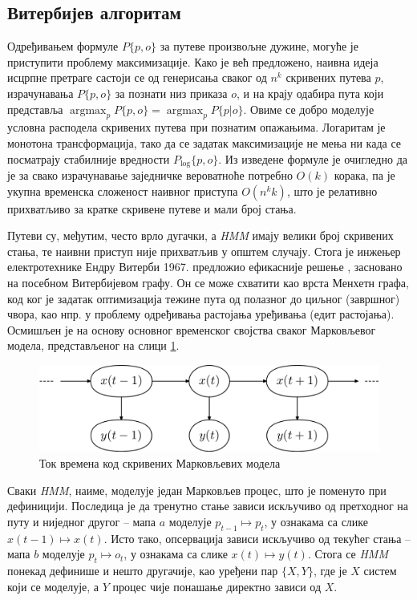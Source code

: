 \documentclass[12pt,oneside]{memoir}
\begin{document}
\begin{CJK}{UTF8}{ipxm}
\section{Витербијев алгоритам}
Одређивањем формуле $P\{p, o\}$ за путеве произвољне дужине, могуће је приступити проблему максимизације. Како је већ предложено, наивна идеја исцрпне претраге састоји се од генерисања сваког од $n^k$ скривених путева $p$, израчунавања $P\{p, o\}$ за познати низ приказа $o$, и на крају одабира пута који представља $\operatorname*{argmax}_p P\{p, o\} = \operatorname*{argmax}_p P\{p | o\}$. Овиме се добро моделује условна расподела скривених путева при познатим опажањима. Логаритам је монотона трансформација, тако да се задатак максимизације не мења ни када се посматрају стабилније вредности $P_{\log}\{p, o\}$. Из изведене формуле је очигледно да је за свако израчунавање заједничке вероватноће потребно $O(k)$ корака, па је укупна временска сложеност наивног приступа $O(n^k k)$, што је релативно прихватљиво за кратке скривене путеве и мали број стања.

Путеви су, међутим, често врло дугачки, а \textit{HMM} имају велики број скривених стања, те наивни приступ није прихватљив у општем случају. Стога је инжењер електротехнике Ендру Витерби 1967. предложио ефикасније решење \cite{viterbi1967}, засновано на посебном Витербијевом графу. Он се може схватити као врста Менхетн графа, код ког је задатак оптимизација тежине пута од полазног до циљног (завршног) чвора, као нпр. у проблему одређивања растојања уређивања (едит растојања). Осмишљен је на основу основног временског својства сваког Марковљевог модела, представљеног на слици \ref{fig:vreme}.

\begin{figure}[H]
  \centering
  \includegraphics[width=.85\textwidth]{vreme.png}
  \caption[]{Ток времена код скривених Марковљевих модела\footnotemark}
  \label{fig:vreme}
\end{figure}


Сваки \textit{HMM}, наиме, моделује један Марковљев процес, што је поменуто при дефиницији. Последица је да тренутно стање зависи искључиво од претходног на путу и ниједног другог -- мапа $a$ моделује $p_{t-1} \mapsto p_t$, у ознакама са слике $x(t-1) \mapsto x(t)$. Исто тако, опсервација зависи искључиво од текућег стања -- мапа  $b$ моделује $p_t \mapsto o_t$, у ознакама са слике $x(t) \mapsto y(t)$. Стога се \textit{HMM} понекад дефинише и нешто другачије, као уређени пар $\{X, Y\}$, где је $X$ систем који се моделује, а $Y$ процес чије понашање директно зависи од $X$.


\end{CJK}
\end{document}
